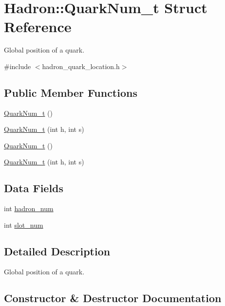 \hypertarget{structHadron_1_1QuarkNum__t}{}\section{Hadron\+:\+:Quark\+Num\+\_\+t Struct Reference}
\label{structHadron_1_1QuarkNum__t}


Global position of a quark.  




{\ttfamily \#include $<$hadron\+\_\+quark\+\_\+location.\+h$>$}

\subsection*{Public Member Functions}
\begin{DoxyCompactItemize}
\item 
\mbox{\hyperlink{structHadron_1_1QuarkNum__t_aa60e284c846b1161380747994dd6c06b}{Quark\+Num\+\_\+t}} ()
\item 
\mbox{\hyperlink{structHadron_1_1QuarkNum__t_a7a990500f4d5bded0bfb10c0e9096263}{Quark\+Num\+\_\+t}} (int h, int s)
\item 
\mbox{\hyperlink{structHadron_1_1QuarkNum__t_aa60e284c846b1161380747994dd6c06b}{Quark\+Num\+\_\+t}} ()
\item 
\mbox{\hyperlink{structHadron_1_1QuarkNum__t_a7a990500f4d5bded0bfb10c0e9096263}{Quark\+Num\+\_\+t}} (int h, int s)
\end{DoxyCompactItemize}
\subsection*{Data Fields}
\begin{DoxyCompactItemize}
\item 
int \mbox{\hyperlink{structHadron_1_1QuarkNum__t_a837a30c976c28b1b6d7c597e755b5900}{hadron\+\_\+num}}
\item 
int \mbox{\hyperlink{structHadron_1_1QuarkNum__t_a6d0d3b601e76b87d83358c5fda8a58b8}{slot\+\_\+num}}
\end{DoxyCompactItemize}


\subsection{Detailed Description}
Global position of a quark. 

\subsection{Constructor \& Destructor Documentation}
\mbox{\label{structHadron_1_1QuarkNum__t_aa60e284c846b1161380747994dd6c06b}} 
